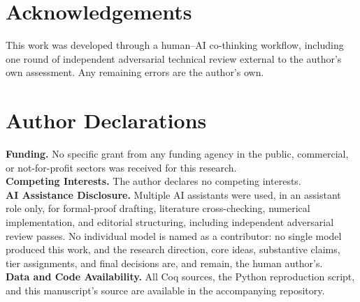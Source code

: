 \documentclass[10pt,twocolumn]{article}
\begin{document}
\section*{Acknowledgements}
This work was developed through a human--AI co-thinking workflow, including one
round of independent adversarial technical review external to the author's own
assessment. Any remaining errors are the author's own.

\section*{Author Declarations}
\textbf{Funding.} No specific grant from any funding agency in the public,
commercial, or not-for-profit sectors was received for this research.\\
\textbf{Competing Interests.} The author declares no competing interests.\\
\textbf{AI Assistance Disclosure.} Multiple AI assistants were used, in an
assistant role only, for formal-proof drafting, literature cross-checking, numerical
implementation, and editorial structuring, including independent adversarial review
passes. No individual model is named as a contributor: no single model produced this
work, and the research direction, core ideas, substantive claims, tier assignments,
and final decisions are, and remain, the human author's.\\
\textbf{Data and Code Availability.} All Coq sources, the Python reproduction
script, and this manuscript's source are available in the accompanying repository.
\end{document}
